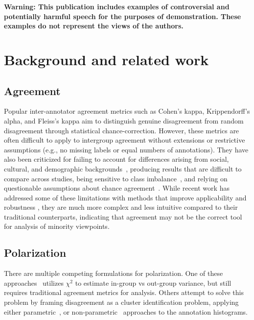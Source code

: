 \documentclass[11pt]{article}
\theoremstyle{definition}
\theoremstyle{plain}
\begin{document}
\noindent\textbf{Warning: This publication includes examples of controversial and potentially harmful speech for the purposes of demonstration. These examples do not represent the views of the authors.}


\section{Background and related work}
\label{sec:related}

\subsection{Agreement}
\label{sec:related:agreement}

Popular inter-annotator agreement metrics such as Cohen's kappa, Krippendorff's alpha, and Fleiss's kappa aim to distinguish genuine disagreement from random disagreement through statistical chance-correction. However, these metrics are often difficult to apply to intergroup agreement without extensions or restrictive assumptions (e.g., no missing labels or equal numbers of annotations). They have also been criticized for failing to account for differences arising from social, cultural, and demographic backgrounds~\citep{Feinstein1990, Byrt1993, van_der_Velden, checco_2017}, producing results that are difficult to compare across studies, being sensitive to class imbalance~\citep{Feinstein1990}, and relying on questionable assumptions about chance agreement~\cite{checco_2017}. While recent work has addressed some of these limitations with methods that improve applicability and robustness \cite{van_der_Velden, wong-etal-2021-cross, ivey-etal-2025-nutmeg}, they are much more complex and less intuitive compared to their traditional counterparts, indicating that agreement may not be the correct tool for analysis of minority viewpoints.


\subsection{Polarization}
\label{sec:related:polarization}

There are multiple competing formulations for polarization. One of these approaches~\cite{akhtar_2019} utilizes $\chi^2$ to estimate in-group vs out-group variance, but still requires traditional agreement metrics for analysis.
Others attempt to solve this problem by framing disagreement as a cluster identification problem, applying either parametric~\cite{checco_2017}, or non-parametric~\cite{pavlopoulos-likas-2024, Mignemi2024} approaches to the annotation histograms. 
\end{document}
